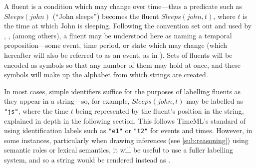\documentclass[a4paper,12pt,leqno]{article}
\newcommand{\vph}[1]{\vphantom{#1}}
\newcommand{\ebox}[1]{\fbox{$\vph{'(),}#1$}}
\newcommand{\EventString}[1]{%
	\renewcommand*{\do}[1]{\ebox{##1}}%
	\PipeParser{#1}%
}
\newcommand{\citeneeded}[1][]{{\color{red}[Citation needed!#1]}}
\newcommand{\nb}[1]{{\color{red}[NB\footnote{{\color{red}#1}}]}}
\begin{document}



A fluent is a condition which may change over time---thus a predicate such as $\allowbreak{}Sleeps(john)$ (``John sleeps'') becomes the fluent $Sleeps(john, t)$, where $t$ is the time at which John is sleeping. Following the convention set out and used by \citet{Mccarthy69somephilosophical}, \citet{van2008proper}, \citet{fernando2016prior} (among others), a fluent may be understood here as naming a temporal proposition---some event, time period, or state which may change (which hereafter will also be referred to as an event, as in \citet{Pustejovsky2005}). Sets of fluents will be encoded as symbols so that any number of them may hold at once, and these symbols will make up the alphabet from which strings are created.

In most cases, simple identifiers suffice for the purposes of labelling fluents as they appear in a string---so, for example, $Sleeps(john, t)$ may be labelled as \texttt{"js"}, where the time $t$ being represented by the fluent's position in the string, explained in depth in the following section. This follows TimeML's standard \citep{timeml2005timeml,pustejovsky2010iso} of using identification labels such as \texttt{"e1"} or \texttt{"t2"} for events and times. However, in some instances, particularly when drawing inferences (see %
\cref{sub:reasoning}) using semantic roles or lexical semantics, it will be useful to use a fuller labelling system, and so a string \EventString{{}|js|{}} would be rendered instead as \EventString{{}|sleeps(john)|{}}.
\end{document}
